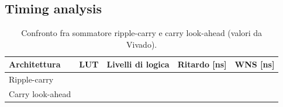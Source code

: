 
\subsection{Timing analysis}

\begin{table}[H]
	\centering\small
	\caption{Confronto fra sommatore ripple-carry e carry look-ahead (valori da Vivado).}
	\label{tab:rca-cla}
	\begin{tabular}{@{}lcccc@{}}
		\toprule
		\textbf{Architettura} & \textbf{LUT} & \textbf{Livelli di logica} & \textbf{Ritardo [\si{\nano\second}]} & \textbf{WNS [\si{\nano\second}]} \\ \midrule
		Ripple-carry     & \todo{} & & & \\
		Carry look-ahead & & & & \\
		\bottomrule
	\end{tabular}
\end{table}
